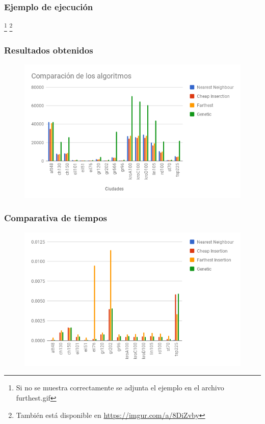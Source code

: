 \documentclass[spanish]{beamer}
\begin{document}
\begin{frame}\frametitle{Ejemplo de ejecución}
  \footnote[1]{Si no se muestra correctamente se adjunta el ejemplo en el archivo furthest.gif}
  \footnote[2]{También está disponible en \href{https://imgur.com/a/8DiZvby}{https://imgur.com/a/8DiZvby}}
\end{frame}

\begin{frame}\frametitle{Resultados obtenidos}
  \begin{figure}[H]
  \centering
  \includegraphics[width=1.1\textwidth]{distancias.png}
\end{figure}
\end{frame}

\begin{frame}\frametitle{Comparativa de tiempos}
  \begin{figure}[H]
  \centering
  \includegraphics[width=1.1\textwidth]{tiempos.png}
\end{figure}
\end{frame}
\end{document}
